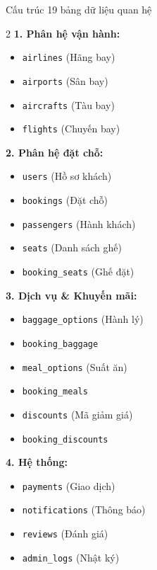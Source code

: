 \documentclass{beamer}
\begin{document}
\begin{frame}{Cấu trúc 19 bảng dữ liệu quan hệ}
  \begin{multicols}{2}
    \textbf{1. Phân hệ vận hành:}
    \begin{itemize}
      \item \texttt{airlines} (Hãng bay)
      \item \texttt{airports} (Sân bay)
      \item \texttt{aircrafts} (Tàu bay)
      \item \texttt{flights} (Chuyến bay)
    \end{itemize}
    \textbf{2. Phân hệ đặt chỗ:}
    \begin{itemize}
      \item \texttt{users} (Hồ sơ khách)
      \item \texttt{bookings} (Đặt chỗ)
      \item \texttt{passengers} (Hành khách)
      \item \texttt{seats} (Danh sách ghế)
      \item \texttt{booking\_seats} (Ghế đặt)
    \end{itemize}
    
    \columnbreak
    
    \textbf{3. Dịch vụ \& Khuyến mãi:}
    \begin{itemize}
      \item \texttt{baggage\_options} (Hành lý)
      \item \texttt{booking\_baggage}
      \item \texttt{meal\_options} (Suất ăn)
      \item \texttt{booking\_meals}
      \item \texttt{discounts} (Mã giảm giá)
      \item \texttt{booking\_discounts}
    \end{itemize}
    \textbf{4. Hệ thống:}
    \begin{itemize}
      \item \texttt{payments} (Giao dịch)
      \item \texttt{notifications} (Thông báo)
      \item \texttt{reviews} (Đánh giá)
      \item \texttt{admin\_logs} (Nhật ký)
    \end{itemize}
  \end{multicols}
\end{frame}
\end{document}
